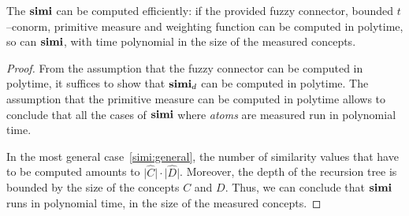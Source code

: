   \begin{proposition}
    The \csm \(\operatorname{\mathbf{simi}}\) can be computed efficiently: if the provided fuzzy connector, bounded \(t\)--conorm, primitive measure and weighting function can be computed in polytime, so can \(\operatorname{\mathbf{simi}}\), with time polynomial in the size of the measured concepts.
  \end{proposition}
  \begin{proof}
    From the assumption that the fuzzy connector can be computed in polytime, it suffices to show that \(\operatorname{\mathbf{simi}}_d\) can be computed in polytime.
    The assumption that the primitive measure can be computed in polytime allows to conclude that all the cases of \(\operatorname{\mathbf{simi}}\) where \emph{atoms} are measured run in polynomial time.

    In the most general case~\eqref{simi:general}, the number of similarity values that have to be computed amounts to \(\lvert \widehat{C} \rvert \cdot \lvert \widehat{D} \rvert\).
    Moreover, the depth of the recursion tree is bounded by the size of the concepts \(C\) and \(D\).
    Thus, we can conclude that \(\operatorname{\mathbf{simi}}\) runs in polynomial time, in the size of the measured concepts.
  \end{proof}
